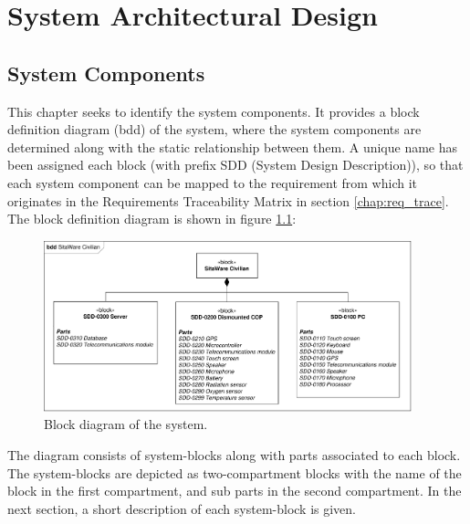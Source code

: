 \chapter{System Architectural Design}
\section{System Components}
This chapter seeks to identify the system components. It provides a block definition diagram (bdd) of the system, where the system components are determined along with the static relationship between them. A unique name has been assigned each block (with prefix SDD (System Design Description)), so that each system component can be mapped to the requirement from which it originates in the Requirements Traceability Matrix in section \ref{chap:req_trace}. The block definition diagram is shown in figure \ref{fig:block_diagram}:
\begin{figure}[H]
\centering
\includegraphics[width=0.95\textwidth]
{billeder/bdd_overordnet.pdf}
\caption{Block diagram of the system.}
\label{fig:block_diagram}
\end{figure}
The diagram consists of system-blocks along with parts associated to each block. The system-blocks are depicted as two-compartment blocks with the name of the block in the first compartment, and sub parts in the second compartment. In the next section, a short description of each system-block is given.
